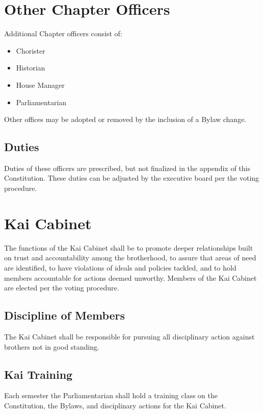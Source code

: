 \section{Other Chapter Officers}

Additional Chapter officers consist of:
\begin{itemize}
        \item Chorister
        \item Historian
        \item House Manager
        \item Parliamentarian
\end{itemize}

Other offices may be adopted or removed by the inclusion of a Bylaw change.

\subsection{Duties}

Duties of these officers are prescribed, but not finalized in the appendix of this Constitution.
These duties can be adjusted by the executive board per the voting procedure.

\section{Kai Cabinet}

The functions of the Kai Cabinet shall be to promote deeper relationships built on trust and accountability among the brotherhood, to assure that areas of need are identified, to have violations of ideals and policies tackled, and to hold members accountable for actions deemed unworthy.
Members of the Kai Cabinet are elected per the voting procedure.

\subsection{Discipline of Members}

The Kai Cabinet shall be responsible for pursuing all disciplinary action against brothers not in good standing.

\subsection{Kai Training}

Each semester the Parliamentarian shall hold a training class on the Constitution, the Bylaws, and disciplinary actions for the Kai Cabinet.

